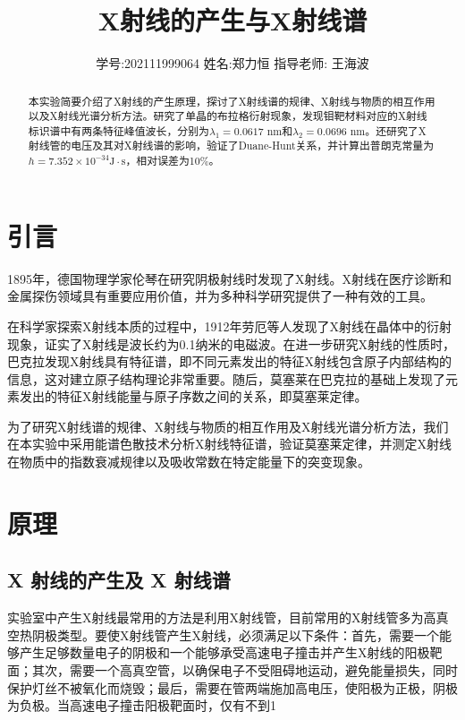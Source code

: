 \documentclass[11pt,a4paper]{article}
\title{\vspace{-4cm}\Large X射线的产生与X射线谱}  %
\author{\kaishu 学号:202111999064 \hspace{1.5cm} 姓名:郑力恒 \hspace{1.5cm} 指导老师: 王海波}   %
\date{}
\begin{document}
\maketitle

\begin{abstract}
    本实验简要介绍了X射线的产生原理，探讨了X射线谱的规律、X射线与物质的相互作用以及X射线光谱分析方法。研究了单晶的布拉格衍射现象，发现钼靶材料对应的X射线标识谱中有两条特征峰值波长，分别为$\lambda_1=0.0617$ nm和$\lambda_2=0.0696$ nm。还研究了X射线管的电压及其对X射线谱的影响，验证了Duane-Hunt关系，并计算出普朗克常量为$h=7.352\times10^{-34}\text{J}\cdot\text{s}$，相对误差为10\%。
	
\end{abstract}

\section{引言}
1895年，德国物理学家伦琴在研究阴极射线时发现了X射线。X射线在医疗诊断和金属探伤领域具有重要应用价值，并为多种科学研究提供了一种有效的工具。

在科学家探索X射线本质的过程中，1912年劳厄等人发现了X射线在晶体中的衍射现象，证实了X射线是波长约为0.1纳米的电磁波。在进一步研究X射线的性质时，巴克拉发现X射线具有特征谱，即不同元素发出的特征X射线包含原子内部结构的信息，这对建立原子结构理论非常重要。随后，莫塞莱在巴克拉的基础上发现了元素发出的特征X射线能量与原子序数之间的关系，即莫塞莱定律。

为了研究X射线谱的规律、X射线与物质的相互作用及X射线光谱分析方法，我们在本实验中采用能谱色散技术分析X射线特征谱，验证莫塞莱定律，并测定X射线在物质中的指数衰减规律以及吸收常数在特定能量下的突变现象。

\section{原理}
\subsection{X 射线的产生及 X 射线谱}
实验室中产生X射线最常用的方法是利用X射线管，目前常用的X射线管多为高真空热阴极类型。要使X射线管产生X射线，必须满足以下条件：首先，需要一个能够产生足够数量电子的阴极和一个能够承受高速电子撞击并产生X射线的阳极靶面；其次，需要一个高真空管，以确保电子不受阻碍地运动，避免能量损失，同时保护灯丝不被氧化而烧毁；最后，需要在管两端施加高电压，使阳极为正极，阴极为负极。当高速电子撞击阳极靶面时，仅有不到1%
\end{document}
